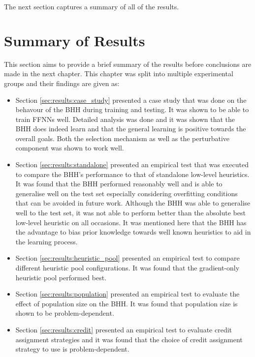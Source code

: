 The next section captures a summary of all of the results.

\section{Summary of Results}
\label{sec:results:summary}

This section aims to provide a brief summary of the results before conclusions are made in the next chapter. This chapter was split into multiple experimental groups and their findings are given as:

\begin{itemize}
      \item Section \ref{sec:results:case_study} presented a case study that was done on the behavour of the \Ac{BHH} during training and testing. It was shown to be able to train \acp{FFNN} well. Detailed analysis was done and it was shown that the \Ac{BHH} does indeed learn and that the general learning is positive towards the overall goals. Both the selection mechanism as well as the perturbative component was shown to work well.

      \item Section \ref{sec:results:standalone} presented an empirical test that was executed to compare the \Ac{BHH}'s performance to that of standalone low-level heuristics. It was found that the \Ac{BHH} performed reasonably well and is able to generalise well on the test set especially considering overfitting conditions that can be avoided in future work. Although the \Ac{BHH} was able to generalise well to the test set, it was not able to perform better than the absolute best low-level heuristic on all occasions. It was mentioned here that the \Ac{BHH} has the advantage to bias prior knowledge towards well known heuristics to aid in the learning process.

      \item Section \ref{sec:results:heuristic_pool} presented an empirical test to compare different heuristic pool configurations. It was found that the gradient-only heuristic pool performed best.

      \item Section \ref{sec:results:population} presented an empirical test to evaluate the effect of population size on the \Ac{BHH}. It was found that population size is shown to be problem-dependent.

      \item Section \ref{sec:results:credit} presented an empirical test to evaluate credit assignment strategies and it was found that the choice of credit assignment strategy to use is problem-dependent.


\end{itemize}
